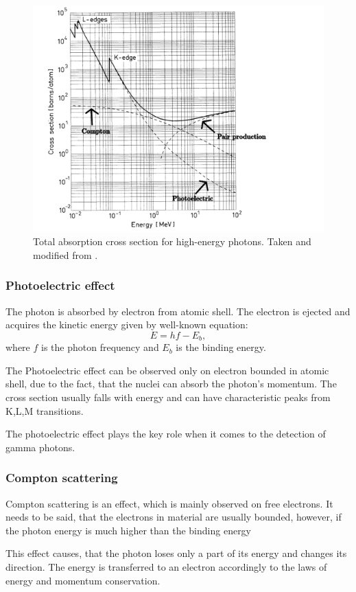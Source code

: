 \begin{figure}[H]
 \centering
 \includegraphics[scale=0.6, angle = 0]{./pictures/totalCross}
 \caption{Total absorption cross section for high-energy photons. Taken and modified from \cite{Leo1987-wy}.}
 \label{cross}
 
\end{figure}
 


\subsubsection{Photoelectric effect}
The photon is absorbed by electron from atomic shell. The electron is ejected and acquires the kinetic energy given by well-known equation:
 \begin{equation}
 E = hf - E_{b},
 \end{equation}
where $f$ is the photon frequency and $E_{b}$ is the binding energy.
 
The Photoelectric effect can be observed only on electron bounded in atomic shell, due to the fact, that the nuclei can absorb the photon's momentum. The cross section usually falls with energy and can have characteristic peaks from K,L,M transitions.

\par

The photoelectric effect plays the key role when it comes to the detection of gamma photons.

\subsubsection{Compton scattering}
Compton scattering is an effect, which is mainly observed on free electrons. It needs to be said, that the electrons in material are usually bounded, however, if the photon energy is much higher than the binding energy 
\par
This effect causes, that the photon loses only a part of its energy and changes its direction. The energy is transferred to an electron accordingly to the laws of energy and momentum conservation.

